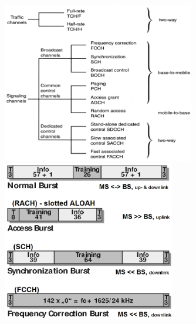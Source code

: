     \begin{center}    
        \includegraphics[height=7cm]{./bilder/systems-gsm-logicalCH.png}
	    \hspace{1cm}
        \includegraphics[height=7cm]{./bilder/systems-gsm-bursts.png}
    \end{center}


